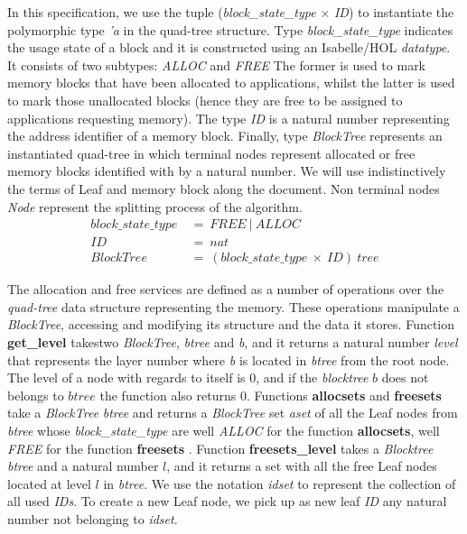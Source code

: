 In this specification, we use the tuple (\emph{block\_state\_type} $\times$ \emph{ID}) to instantiate the polymorphic {type} \emph{'a} in the quad-tree structure. Type \emph{block\_state\_type} {indicates} the usage state of a block {and it is constructed using an Isabelle/HOL \emph{datatype}}. It consists of two subtypes{:} \emph{ALLOC} and \emph{FREE} {The former is used to mark memory blocks that have been allocated to applications, whilst the latter is used to mark those unallocated blocks (hence they are free to be assigned to applications requesting memory)}. {The type \emph{ID} is a natural number representing the} address identifier of a memory block. Finally, type \emph{BlockTree} represents an instantiated quad-tree {in which terminal nodes represent allocated or free memory blocks identified with by a natural number. We will use indistinctively the terms of Leaf and memory block along the document}. Non terminal nodes \emph{Node} represent the splitting process of the algorithm. 
{\footnotesize
	\begin{align*}
	block\_state\_type\ &=\ FREE\ |\ ALLOC \\
	ID\ &=\ nat \\
	BlockTree\ &=\ (block\_state\_type\ \times\ ID)\ tree
	\end{align*}
}

{The allocation and free services are defined as a number of operations over the \emph{quad-tree} data structure representing the memory. These operations manipulate a \textsl{BlockTree}, accessing and modifying its structure and the data it stores}. Function \textbf{get\_level} takes{two \emph{BlockTree}, \emph{btree} and \emph{b}}, {and it returns a natural number \emph{level}} {that} represents the layer number {where} \emph{b} {is located} in \emph{btree} from the root node. {The level of a node with regards to itself is $0$, and if the \emph{blocktree} $b$ does not belongs to $btree$ the function also returns $0$.}  Functions \textbf{allocsets} and \textbf{freesets} take a \emph{BlockTree} \emph{btree} and returns a \emph{BlockTree} set \emph{aset} of all the Leaf nodes from \emph{btree} whose \emph{block\_state\_type} are well \emph{ALLOC} for the function \textbf{allocsets}, well \emph{FREE} for the function \textbf{freesets}  . Function \textbf{freesets\_level} takes a \emph{Blocktree} \emph{btree} and a natural number $l$, and it returns a set with all the free Leaf nodes located at level $l$ in \emph{btree}. We use {the} notation \emph{idset} to represent the collection of all used \emph{IDs}. To create a new Leaf node, we {pick up as new leaf \emph{ID} any natural number not belonging to \emph{idset}}.

